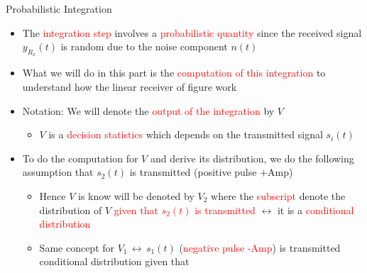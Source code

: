 \documentclass{Beamer}
\begin{document}
\begin{frame}[t]{Probabilistic Integration}

\begin{itemize}

\item The \textcolor{red}{integration step} involves a \textcolor{red}{probabilistic quantity} since the received signal $y_{R_x}(t)$ is random due to the noise component $n(t)$

\item What we will do in this part is the \textcolor{red}{computation of this integration} to understand how the linear receiver of  figure work

\item Notation: We will denote the \textcolor{red}{output of the integration} by $V$

	\begin{itemize}
	\item $V$ is a \textcolor{red}{decision statistics} which depends on the transmitted signal $s_i(t)$
	\end{itemize}

\item To do the computation for $V$ and derive its distribution, we do the following assumption that $s_2(t)$ is transmitted (positive pulse +Amp)

	\begin{itemize}
	\item Hence $V$ is know will be denoted by $V_2$ where the \textcolor{red}{subscript} denote the distribution of $V$ \textcolor{red}{given that $s_2(t)$ is transmitted} $\leftrightarrow$ it is a \textcolor{red}{conditional distribution}
	
	\item Same concept for $V_1 \, \leftrightarrow \, s_1(t)$ (\textcolor{red}{negative pulse -Amp}) is transmitted conditional distribution given that 
	\end{itemize}

\end{itemize}

\end{frame}
\end{document}
